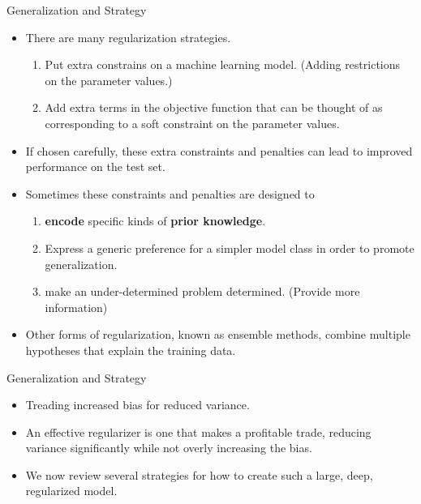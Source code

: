\documentclass[10pt]{beamer}
\begin{document}
	\begin{frame}{Generalization and Strategy}
		\begin{itemize}
			\item There are many regularization strategies.
			\begin{enumerate}
				\pause
				\item Put extra constrains on a machine learning model. (Adding restrictions on the parameter values.)
				\pause
				\item Add extra terms in the objective function that can be thought of as corresponding to a soft constraint on the parameter values.
			\end{enumerate}
			\pause
			\item If chosen carefully, these extra constraints and penalties can lead to improved performance on the test set.
			\pause
			\item Sometimes these constraints and penalties are designed to
			\begin{enumerate}
				\item \textbf{encode} specific kinds of \textbf{prior knowledge}.
				\item Express a generic preference for a simpler model class in order to promote generalization.
				\item make an under-determined problem determined. (Provide more information)
			\end{enumerate}
			\pause
			\item Other forms of regularization, known as ensemble methods, combine multiple hypotheses that explain the training data.
		\end{itemize}
	\end{frame}
	
	\begin{frame}{Generalization and Strategy}
		\begin{itemize}
			\item Treading increased bias for reduced variance.
			\pause
			\item An effective regularizer is one that makes a profitable trade, reducing variance significantly while not overly increasing the bias.
			\pause
			\item We now review several strategies for how to create such a large, deep, regularized model.
		\end{itemize}
	\end{frame}
	
\end{document}
